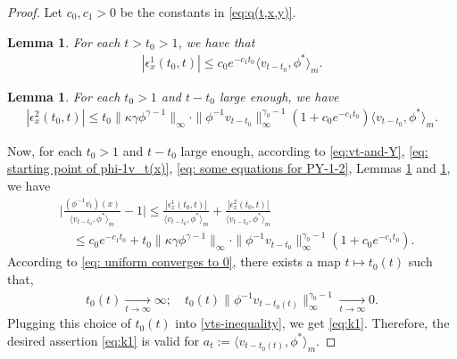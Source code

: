 \documentclass[12pt,a4paper]{amsart}
\newtheorem{lem}[thm]{Lemma}
\theoremstyle{definition}
\numberwithin{equation}{section}
\begin{document}
\begin{proof}
  Let $c_0, c_1>0$ be the constants in \eqref{eq:q(t,x,y)}.
  \begin{lem}
    \label{lem:bound_for_epsilon1}
    For each $t > t_0 > 1$, we have that
    \begin{align}
      |\epsilon_x^1(t_0,t)|
      \leq c_0 e^{-c_1 t_0}\langle v_{t-t_0},\phi^* \rangle_m.
    \end{align}
  \end{lem}
  
  \begin{lem}
    \label{lem:upperbound_of_epsilon-2}
    For each $t_0 > 1$ and $t - t_0$ large enough, we have
    \begin{align}
      \label{eq:upperbound_of_epsilon-2}
      |\epsilon_x^2(t_0,t)|
      \leq t_0\|\kappa\gamma\phi^{\gamma - 1}\|_{\infty} \cdot \|\phi^{-1}v_{t-t_0}\|^{\gamma_0-1}_\infty (1+c_0 e^{-c_1 t_0}) \langle v_{t-t_0},\phi^* \rangle_m.
    \end{align}
  \end{lem}

  Now, for each $t_0 > 1$ and $t-t_0$ large enough, according to \eqref{eq:vt-and-Y},  \eqref{eq: starting point of phi-1v_t(x)}, \eqref{eq: some equations for PY-1-2}, Lemmas \ref{lem:bound_for_epsilon1} and \ref{lem:upperbound_of_epsilon-2}, we have
  \begin{align} 
    \label{vts-inequality}
    &\Big|\frac{(\phi^{-1}v_t)(x)}{\langle v_{t-t_0},\phi^* \rangle_m}-1 \Big|
      \leq \frac{|\epsilon_x^1(t_0,t)|}{\langle v_{t-t_0},\phi^* \rangle_m} + \frac{|\epsilon_x^2(t_0,t)|}{\langle v_{t-t_0},\phi^* \rangle_m}\\
    & \quad \leq c_0e^{-c_1 t_0} +t_0\|\kappa\gamma\phi^{\gamma - 1}\|_{\infty}
      \cdot \|\phi^{-1}v_{t-t_0}\|^{\gamma_0-1}_\infty (1+c_0 e^{-c_1 t_0}).
  \end{align}
  According to \eqref{eq: uniform converges to 0}, there exists a map $t\mapsto t_0(t)$ such that,
  \begin{align}
    t_0(t)
    \xrightarrow[t\to\infty]{} \infty;
    \quad t_0(t)\| \phi^{-1}v_{t-t_0(t)}\|^{\gamma_0 - 1}_\infty
    \xrightarrow[t\to\infty]{} 0.
  \end{align}
 Plugging this choice of $t_0(t)$ into \eqref{vts-inequality}, we get \eqref{eq:k1}.
  Therefore, the desired assertion \eqref{eq:k1} is valid for $a_t := \langle v_{t-t_0(t)},\phi^* \rangle_m$.
\end{proof}
\end{document}
